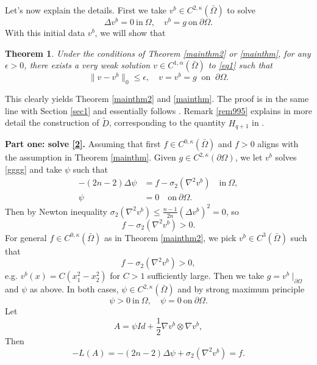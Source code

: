 \documentclass[reqno,12pt]{amsart}
\numberwithin{equation}{section}
\theoremstyle{plain}
\newtheorem{thm}{Theorem}[section]
\theoremstyle{definition}
\begin{document}
Let's now explain the details. First we take $v^b\in C^{2,\kappa}(\bar\Omega)$ to solve
\begin{equation}\label{gggg}
    \Delta v^b = 0\ \text{in}\ \Omega,\quad
    v^b = g\ \text{on}\ \partial\Omega.
\end{equation}
With this initial data $v^b$, we will show that 
\begin{thm}\label{mainthm3}
    Under the conditions of Theorem \ref{mainthm2} or \ref{mainthm}, for any $\epsilon>0$, there exists a very weak solution $v\in C^{1,\alpha}(\bar\Omega)$ to \eqref{eq1} such that
\begin{equation*}
    \|v-v^b\|_0\le \epsilon,\quad v=v^b=g\ \text{ on }\ \partial\Omega.
\end{equation*}
\end{thm}
This clearly yields Theorem \ref{mainthm2} and \ref{mainthm}. The proof is in the same line with Section \ref{sec1} and essentially follows \cite{cao23dirichlet}. Remark \ref{rem995} explains in more detail the construction of $\tilde D$, corresponding to the quantity $H_{q+1}$ in \cite[page 19]{cao23dirichlet}.

\textbf{Part one: solve \eqref{2}.} 
Assuming that first $f\in C^{0,\kappa}(\bar\Omega)$ and $f>0$ aligns with the assumption in Theorem \ref{mainthm}. Given $g\in C^{2,\kappa}(\partial\Omega)$, we let $v^b$ solves \eqref{gggg} and take $\psi$ such that
\begin{align*}
    -(2n-2)\Delta \psi &= f-\sigma_2(\nabla^2 v^b) \quad \text{in}\ \Omega,\\
    \psi &= 0 \quad\text{on}\ \partial\Omega.
\end{align*}
Then by Newton inequality  $\sigma_2(\nabla^2 v^b)\leq \frac{n-1}{2n} (\Delta v^b)^2  = 0$, so
\begin{equation*}
    f-\sigma_2(\nabla^2 v^b)>0.
\end{equation*}
For general $f\in C^{0,\kappa}(\bar\Omega)$ as in Theorem \ref{mainthm2}, we pick $v^b\in C^{3}(\bar\Omega)$ such that 
\begin{equation*}
f-\sigma_2(\nabla^2 v^b)>0,
\end{equation*}
e.g. $v^b(x)=C(x_1^2-x_2^2)$ for $C>1$ sufficiently large. Then we take $g=v^b\mid_{\partial\Omega}$ and $\psi$ as above. 
In both cases, $\psi\in C^{2,\kappa}(\bar\Omega)$ and by strong maximum principle
\begin{equation*}
    \psi>0\ \text{in}\ \Omega,\quad \psi=0\ \text{on}\ \partial\Omega.
\end{equation*}
Let
\begin{equation*}
A=\psi Id+\frac{1}{2}\nabla v^b\otimes\nabla v^b, 
\end{equation*}
Then
\begin{equation*}
    -L(A)=-(2n-2)\Delta \psi+\sigma_2(\nabla^2 v^b)=f.
\end{equation*}
\end{document}
